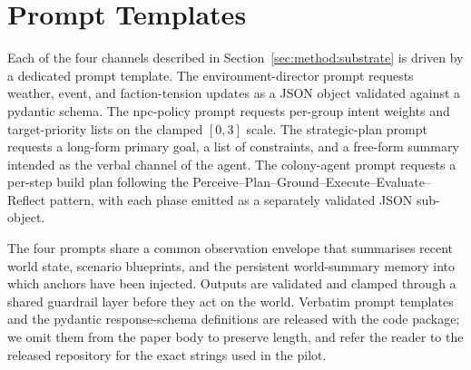 \section{Prompt Templates}
\label{app:prompts}

Each of the four channels described in
Section~\ref{sec:method:substrate} is driven by a dedicated prompt
template. The environment-director prompt requests weather, event,
and faction-tension updates as a JSON object validated against a
pydantic schema. The npc-policy prompt requests per-group intent
weights and target-priority lists on the clamped $[0, 3]$ scale.
The strategic-plan prompt requests a long-form primary goal, a
list of constraints, and a free-form summary intended as the
verbal channel of the agent. The colony-agent prompt requests a
per-step build plan following the
Perceive--Plan--Ground--Execute--Evaluate--Reflect pattern, with
each phase emitted as a separately validated JSON sub-object.

The four prompts share a common observation envelope that
summarises recent world state, scenario blueprints, and the
persistent world-summary memory into which anchors have been
injected. Outputs are validated and clamped through a shared
guardrail layer before they act on the world. Verbatim prompt
templates and the pydantic response-schema definitions are
released with the code package; we omit them from the paper body
to preserve length, and refer the reader to the released
repository for the exact strings used in the pilot.
